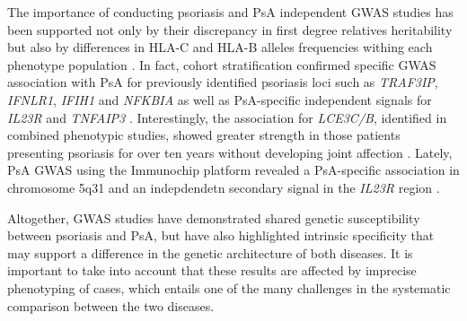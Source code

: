 The importance of conducting psoriasis and PsA independent GWAS studies has been supported not only by their discrepancy in first degree relatives heritability but also by differences in HLA-C and HLA-B alleles frequencies withing each phenotype population \parencite{Winchester2012, Okada2014}. In fact, cohort stratification confirmed specific GWAS association with PsA for previously identified psoriasis loci such as \textit{TRAF3IP}, \textit{IFNLR1}, \textit{IFIH1} and \textit{NFKBIA} as well as PsA-specific independent signals for \textit{IL23R} and \textit{TNFAIP3} \parencite{Ellinghaus2010, Stuart2015}.  Interestingly, the association for \textit{LCE3C/B}, identified in combined phenotypic studies, showed greater strength in those patients presenting psoriasis for over ten years without developing joint affection \parencite{Stuart2015}. Lately, PsA GWAS using the Immunochip platform revealed a PsA-specific association in chromosome 5q31 and an indepdendetn secondary signal in the \textit{IL23R} region \parencite{Bowes2015}. 

Altogether, GWAS studies have demonstrated shared genetic susceptibility between psoriasis and PsA, but have also highlighted intrinsic specificity that may support a difference in the genetic architecture of both diseases. It is important to take into account that these results are affected by imprecise phenotyping of cases, which entails one of the many challenges in the systematic comparison between the two diseases.


